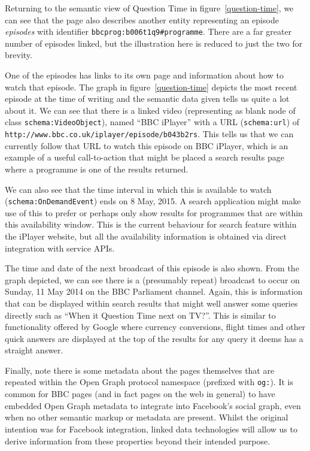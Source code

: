 Returning to the semantic view of Question Time in figure~\ref{question-time},
we can see that the page also describes another entity representing
an episode \emph{episodes} with identifier \texttt{bbcprog:b006t1q9\#programme}.
There are a far greater
number of episodes linked, but the illustration here is reduced to
just the two for brevity.

One of the episodes has links to its own page and information
about how to watch that episode. The graph in figure~\ref{question-time}
depicts the most recent episode at the time of writing and the
semantic data given tells us quite a lot about it. We can see
that there is a linked video (representing as blank node of
class \texttt{schema:VideoObject}), named ``BBC iPlayer'' with
a URL (\texttt{schema:url}) of \texttt{http://www.bbc.co.uk/iplayer/episode/b043b2rs}.
This tells us that we can currently follow that URL to watch
this episode on BBC iPlayer, which is an example of a useful
call-to-action that might be placed a search results page where
a programme is one of the results returned.

We can also see that the time interval in which this is available
to watch (\texttt{schema:OnDemandEvent}) ends on 8 May, 2015. A
search application might make use of this to prefer or perhaps
only show results for programmes that are within this availability
window. This is the current behaviour for search feature within
the iPlayer website, but all the availability information is
obtained via direct integration with service APIs.

The time and date of the next broadcast of this episode is also shown.
From the graph depicted, we can see there is a (presumably repeat)
broadcast to occur on Sunday, 11 May 2014 on the BBC Parliament
channel. Again, this is information that can be displayed within
search results that might well answer some queries directly
such as ``When it Question Time next on TV?''. This is similar
to functionality offered by Google where currency conversions,
flight times and other quick answers are displayed at the top
of the results for any query it deems has a straight answer.

Finally, note there is some metadata about the pages themselves
that are repeated within the Open Graph protocol namespace
(prefixed with \texttt{og:}). It is common for BBC pages (and
in fact pages on the web in general) to have embedded Open
Graph metadata to integrate into Facebook's social graph, even
when no other semantic markup or metadata are present. Whilst
the original intention was for Facebook integration, linked
data technologies will allow us to derive information from
these properties beyond their intended purpose.

